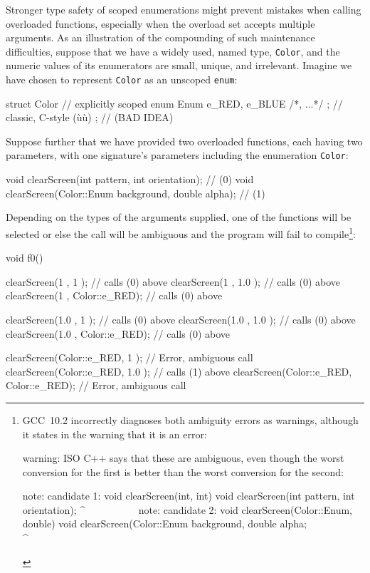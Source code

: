 Stronger type safety of scoped enumerations might prevent mistakes when calling overloaded functions, especially when the overload set accepts multiple arguments. As an illustration of the compounding of such maintenance
difficulties, suppose that we have a widely used, named type,
\lstinline!Color!, and the numeric values of its enumerators are small,
unique, and irrelevant. Imagine we have chosen to represent
\lstinline!Color! as an unscoped \lstinline!enum!:

\begin{emcppslisting}[emcppsbatch=e7]
struct Color
{                                           // explicitly scoped
    enum Enum { e_RED, e_BLUE /*, ...*/ };  // classic, C-style (ù{}ù)
};                                          // (BAD IDEA)
\end{emcppslisting}

\noindent Suppose further that we have provided two overloaded functions, each
having two parameters, with one signature's parameters including the
enumeration \lstinline!Color!:

\begin{emcppslisting}[emcppsbatch=e7]
void clearScreen(int pattern, int orientation);          // (0)
void clearScreen(Color::Enum background, double alpha);  // (1)
\end{emcppslisting}

\noindent Depending on the types of the arguments supplied, one of the
functions will be selected or else the call will be ambiguous and the
program will fail to compile{\cprotect\footnote{GCC~10.2 incorrectly diagnoses both ambiguity errors as warnings, although it
states in the warning that it is an error:

\begin{emcppslisting}[language=bash,style=footcodeplain]
warning: ISO C++ says that these are ambiguous, even though the worst conversion for the
         first is better than the worst conversion for the second:

note: candidate 1: void clearScreen(int, int)
void clearScreen(int pattern, int orientation);
     ^~~~~~~~~~~
note: candidate 2: void clearScreen(Color::Enum, double)
void clearScreen(Color::Enum background, double alpha;
     ^~~~~~~~~~~
\end{emcppslisting}
      }}:

\begin{emcppslisting}[emcppsbatch=e7]
void f0()
{
    clearScreen(1           , 1           );  // calls (0) above
    clearScreen(1           , 1.0         );  // calls (0) above
    clearScreen(1           , Color::e_RED);  // calls (0) above

    clearScreen(1.0         , 1           );  // calls (0) above
    clearScreen(1.0         , 1.0         );  // calls (0) above
    clearScreen(1.0         , Color::e_RED);  // calls (0) above

    clearScreen(Color::e_RED, 1           );  // Error, ambiguous call
    clearScreen(Color::e_RED, 1.0         );  // calls (1) above
    clearScreen(Color::e_RED, Color::e_RED);  // Error, ambiguous call
}
\end{emcppslisting}

